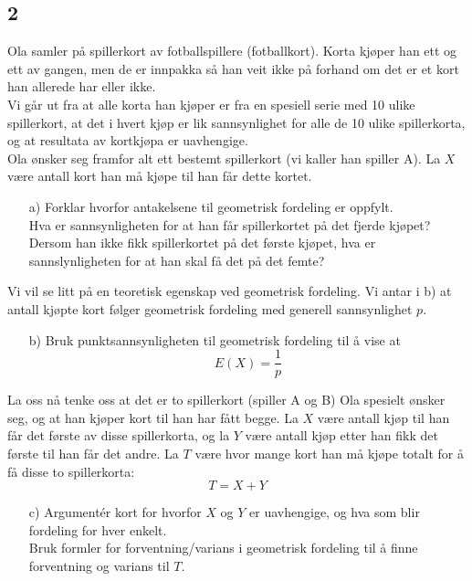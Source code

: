 \documentclass[10pt,a4paper]{article}
\begin{document}
\subsection*{2}
Ola samler p{\aa} spillerkort av fotballspillere (fotballkort).
Korta kj{\o}per han ett og ett av gangen, men de er
innpakka s{\aa} han veit ikke p{\aa} forhand om det
er et kort han allerede har eller ikke.
\\
Vi g{\aa}r ut fra at alle korta han kj{\o}per er fra en spesiell serie med 10 ulike spillerkort,
at det i hvert kj{\o}p er lik sannsynlighet for alle de 10 ulike spillerkorta,
og at resultata av kortkj{\o}pa er uavhengige.
\\
Ola {\o}nsker seg framfor alt ett bestemt spillerkort (vi kaller han spiller A).
La $X$ v{\ae}re antall kort han m{\aa} kj{\o}pe til han f{\aa}r dette kortet.
\begin{itemize}
\item[a)\protect{\hspace{3.5mm}}] 
Forklar hvorfor antakelsene til geometrisk fordeling er oppfylt.
\\
Hva er sannsynligheten for at han f{\aa}r spillerkortet p{\aa} det fjerde kj{\o}pet?
\\
Dersom han ikke fikk spillerkortet p{\aa} det f{\o}rste kj{\o}pet,
hva er sannslynligheten for at han skal f{\aa} det p{\aa} det femte?
\end{itemize}
Vi vil se litt p{\aa} en teoretisk egenskap ved geometrisk fordeling.
Vi antar i b) at antall kj{\o}pte kort f{\o}lger
geometrisk fordeling med generell sannsynlighet $p$.
\begin{itemize}
\item[b)\protect{\hspace{3.5mm}}] 
Bruk punktsannsynligheten til geometrisk fordeling til {\aa} vise at
\[
E(X) = \frac{1}{p}
\]
\end{itemize}
La oss n{\aa} tenke oss at det er to spillerkort (spiller A og B) Ola spesielt {\o}nsker seg, 
og at han kj{\o}per kort til han har f{\aa}tt begge.
La $X$ v{\ae}re antall kj{\o}p til han f{\aa}r det f{\o}rste av disse spillerkorta,
og la $Y$ v{\ae}re antall kj{\o}p etter han fikk det f{\o}rste til han f{\aa}r det andre.
La $T$ v{\ae}re hvor mange kort han m{\aa} kj{\o}pe totalt for {\aa} f{\aa} disse to spillerkorta:
\[
T = X + Y
\]
\begin{itemize}
\item[c)\protect{\hspace{3.5mm}}] 
Argument\'er kort for hvorfor $X$ og $Y$ er uavhengige,
og hva som blir fordeling for hver enkelt.
\\
Bruk formler for forventning/varians i geometrisk fordeling til {\aa}
finne forventning og varians til $T$.
\end{itemize}
\end{document}
